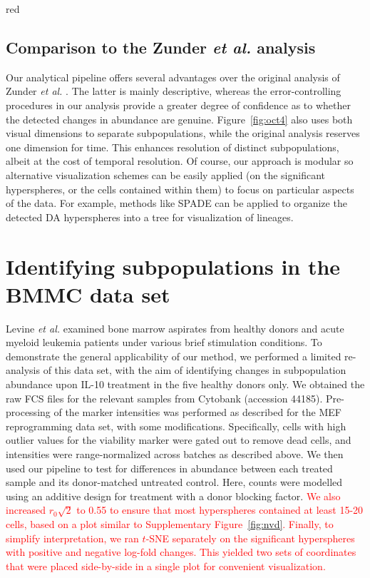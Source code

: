 \documentclass{article}
\newcommand\revised[1]{\textcolor{red}{#1}}
\begin{document}
\begin{color}{red}
\subsection{Comparison to the Zunder \textit{et al.} analysis}
Our analytical pipeline offers several advantages over the original analysis of Zunder \emph{et al.} \cite{zunder2015continuous}.
The latter is mainly descriptive, whereas the error-controlling procedures in our analysis provide a greater degree of confidence as to whether the detected changes in abundance are genuine.
Figure~\ref{fig:oct4} also uses both visual dimensions to separate subpopulations, while the original analysis reserves one dimension for time.
This enhances resolution of distinct subpopulations, albeit at the cost of temporal resolution.
Of course, our approach is modular so alternative visualization schemes can be easily applied (on the significant hyperspheres, or the cells contained within them) to focus on particular aspects of the data.
For example, methods like SPADE can be applied to organize the detected DA hyperspheres into a tree for visualization of lineages.
\end{color}

\section{Identifying subpopulations in the BMMC data set}
\label{sec:bmmc}
Levine \textit{et al.} \cite{levine2015datadriven} examined bone marrow aspirates from healthy donors and acute myeloid leukemia patients under various brief stimulation conditions.
To demonstrate the general applicability of our method, we performed a limited re-analysis of this data set, with the aim of identifying changes in subpopulation abundance upon IL-10 treatment in the five healthy donors only.
We obtained the raw FCS files for the relevant samples from Cytobank (accession 44185).
Pre-processing of the marker intensities was performed as described for the MEF reprogramming data set, with some modifications.
Specifically, cells with high outlier values for the viability marker were gated out to remove dead cells, and intensities were range-normalized across batches as described above.
We then used our pipeline to test for differences in abundance between each treated sample and its donor-matched untreated control.
Here, counts were modelled using an additive design for treatment with a donor blocking factor.
\revised{We also increased $r_0\sqrt{2}$ to 0.55 to ensure that most hyperspheres contained at least 15-20 cells, based on a plot similar to Supplementary Figure~\ref{fig:nvd}.
Finally, to simplify interpretation, we ran $t$-SNE separately on the significant hyperspheres with positive and negative log-fold changes.
This yielded two sets of coordinates that were placed side-by-side in a single plot for convenient visualization.
}
\end{document}
